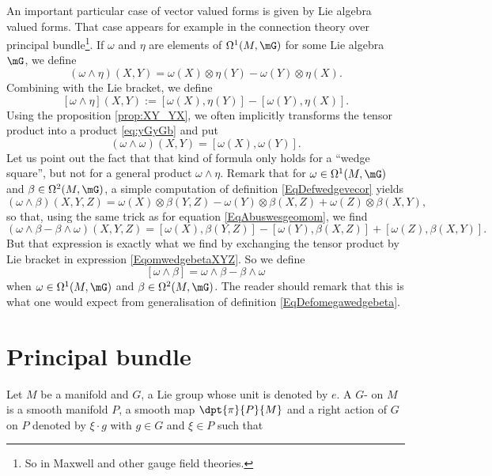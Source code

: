 An important particular case of vector valued forms is given by Lie algebra valued forms. That case appears for example in the connection theory over principal bundle\footnote{So in Maxwell and other gauge field theories.}. If $\omega$ and $\eta$ are elements of $\Omega^1(M,\mG)$ for some Lie algebra $\mG$, we define
\[ 
		(\omega\wedge\eta)(X,Y)=\omega(X)\otimes\eta(Y)-\omega(Y)\otimes\eta(X).
\]
Combining with the Lie bracket, we define
\begin{equation}	\label{EqDefomegawedgebeta}
[\omega\wedge\eta](X,Y):=[\omega(X),\eta(Y)]-[\omega(Y),\eta(X)].
\end{equation}
Using the proposition \ref{prop:XY_YX}, we often implicitly transforms the tensor product into a product \eqref{eq:yGyGb} and put
\begin{equation}	\label{EqAbuswesgeomom}
  (\omega\wedge\omega)(X,Y)=[\omega(X),\omega(Y)].
\end{equation}
Let us point out the fact that that kind of formula only holds for a ``wedge square'', but not for a general product $\omega\wedge\eta$. Remark that for $\omega\in\Omega^1(M,\mG)$ and $\beta\in\Omega^2(M,\mG)$, a simple computation of definition \eqref{EqDefwedgevecor} yields
\begin{equation}	\label{EqomwedgebetaXYZ}
(\omega\wedge\beta)(X,Y,Z)=\omega(X)\otimes\beta(Y,Z)-\omega(Y)\otimes\beta(X,Z)+\omega(Z)\otimes\beta(X,Y),
\end{equation}
so that, using the same trick as for equation \eqref{EqAbuswesgeomom}, we find
\[ 
  (\omega\wedge\beta-\beta\wedge\omega)(X,Y,Z)=[\omega(X),\beta(Y,Z)]-[\omega(Y),\beta(X,Z)]+[\omega(Z),\beta(X,Y)].
\]
But that expression is exactly what we find by exchanging the tensor product by Lie bracket in expression \eqref{EqomwedgebetaXYZ}. So we define
\begin{equation}	\label{EqDefCrochwedgedeux}
[\omega\wedge\beta]=\omega\wedge\beta-\beta\wedge\omega
\end{equation}
when $\omega\in\Omega^1(M,\mG)$ and $\beta\in\Omega^2(M,\mG)$. The reader should remark that this is what one would expect from generalisation of definition \eqref{EqDefomegawedgebeta}. 
\section{Principal bundle}

Let $M$ be a manifold and $G$, a Lie group whose unit is denoted by $e$. A $G$- on $M$ is a smooth manifold $P$, a smooth map $\dpt{\pi}{P}{M}$ and a right action of $G$ on $P$ denoted by $\xi\cdot g$ with $g\in G$ and $\xi\in P$ such that

